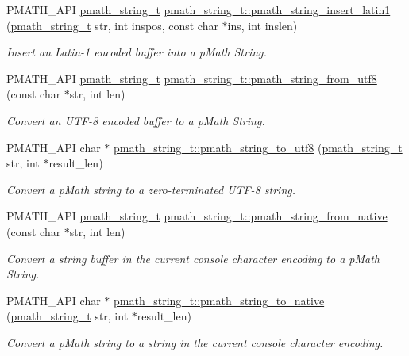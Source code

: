 \begin{CompactItemize}
PMATH\_\-API \hyperlink{classpmath__string__t}{pmath\_\-string\_\-t} \hyperlink{group__strings_g0016e7daa5ca421a48b6d8bd3c5f7ff5}{pmath\_\-string\_\-t::pmath\_\-string\_\-insert\_\-latin1} (\hyperlink{classpmath__string__t}{pmath\_\-string\_\-t} str, int inspos, const char $\ast$ins, int inslen)
\begin{CompactList}\small\item\em Insert an Latin-1 encoded buffer into a pMath String. \item\end{CompactList}\item 
PMATH\_\-API \hyperlink{classpmath__string__t}{pmath\_\-string\_\-t} \hyperlink{group__strings_g0591f864ff17f7c27dc7b5032dab7551}{pmath\_\-string\_\-t::pmath\_\-string\_\-from\_\-utf8} (const char $\ast$str, int len)
\begin{CompactList}\small\item\em Convert an UTF-8 encoded buffer to a pMath String. \item\end{CompactList}\item 
PMATH\_\-API char $\ast$ \hyperlink{group__strings_g881c2e70d81dd43a79d5ccbecc933e79}{pmath\_\-string\_\-t::pmath\_\-string\_\-to\_\-utf8} (\hyperlink{classpmath__string__t}{pmath\_\-string\_\-t} str, int $\ast$result\_\-len)
\begin{CompactList}\small\item\em Convert a pMath string to a zero-terminated UTF-8 string. \item\end{CompactList}\item 
PMATH\_\-API \hyperlink{classpmath__string__t}{pmath\_\-string\_\-t} \hyperlink{group__strings_g37cf187968e366edd0998dda0bd5ea7a}{pmath\_\-string\_\-t::pmath\_\-string\_\-from\_\-native} (const char $\ast$str, int len)
\begin{CompactList}\small\item\em Convert a string buffer in the current console character encoding to a pMath String. \item\end{CompactList}\item 
PMATH\_\-API char $\ast$ \hyperlink{group__strings_g7ccade7efa65dc24f7cd573f15fc07e9}{pmath\_\-string\_\-t::pmath\_\-string\_\-to\_\-native} (\hyperlink{classpmath__string__t}{pmath\_\-string\_\-t} str, int $\ast$result\_\-len)
\begin{CompactList}\small\item\em Convert a pMath string to a string in the current console character encoding. \item\end{CompactList}\item 

\end{CompactItemize}
